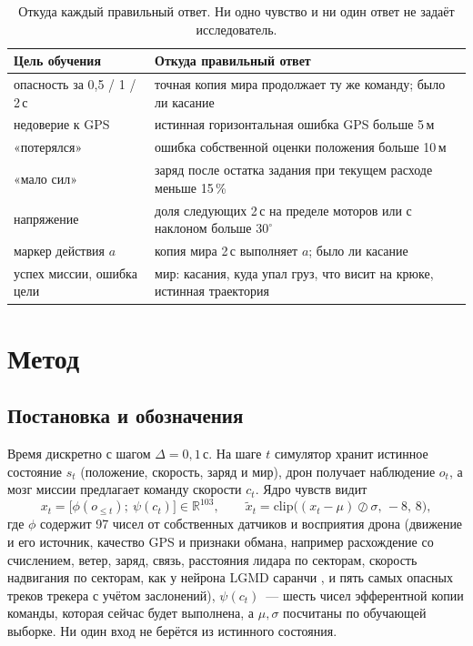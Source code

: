 \documentclass[10pt]{article}
\begin{document}
\begin{table}[t]
\centering\small
\caption{Откуда каждый правильный ответ. Ни одно чувство и ни один ответ не задаёт исследователь.}
\label{tab:prov}
\begin{tabularx}{\linewidth}{@{}lX@{}}
\toprule
Цель обучения & Откуда правильный ответ \\
\midrule
опасность за 0,5 / 1 / 2\,с & точная копия мира продолжает ту же команду; было ли касание \\
недоверие к GPS & истинная горизонтальная ошибка GPS больше 5\,м \\
«потерялся» & ошибка собственной оценки положения больше 10\,м \\
«мало сил» & заряд после остатка задания при текущем расходе меньше 15\,\% \\
напряжение & доля следующих 2\,с на пределе моторов или с наклоном больше $30^\circ$ \\
маркер действия $a$ & копия мира 2\,с выполняет $a$; было ли касание \\
успех миссии, ошибка цели & мир: касания, куда упал груз, что висит на крюке, истинная траектория \\
\bottomrule
\end{tabularx}
\end{table}

\section{Метод}\label{sec:method}
\subsection{Постановка и обозначения}
Время дискретно с шагом $\Delta=0{,}1$\,с. На шаге $t$ симулятор хранит истинное состояние $s_t$ (положение, скорость, заряд и
мир), дрон получает наблюдение $o_t$, а мозг миссии предлагает команду скорости $c_t$. Ядро чувств видит
\begin{equation}
x_t=\big[\phi(o_{\le t});\ \psi(c_t)\big]\in\mathbb{R}^{103},\qquad \tilde x_t=\mathrm{clip}\big((x_t-\mu)\oslash\sigma,\,-8,\,8\big),
\end{equation}
где $\phi$ содержит 97 чисел от собственных датчиков и восприятия дрона (движение и его источник, качество GPS и признаки обмана,
например расхождение со счислением, ветер, заряд, связь, расстояния лидара по секторам, скорость надвигания по секторам, как у
нейрона LGMD саранчи \citep{gabbiani2002}, и пять самых опасных треков трекера с учётом заслонений), $\psi(c_t)$~--- шесть чисел
эфферентной копии \citep{vonholst1950} команды, которая сейчас будет выполнена, а $\mu,\sigma$ посчитаны по обучающей выборке. Ни один вход не берётся
из истинного состояния.
\end{document}
